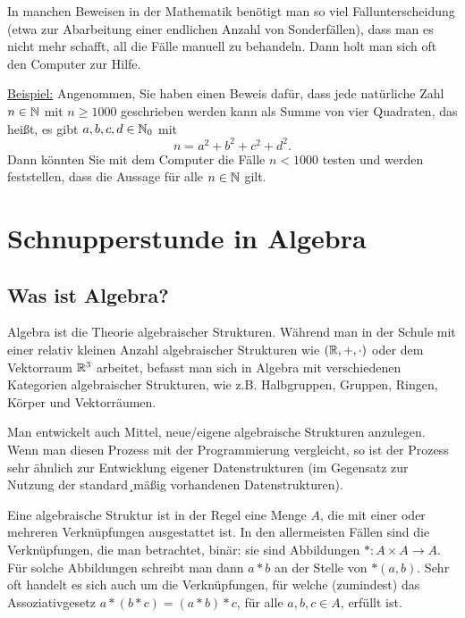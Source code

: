 \begin{bem} 
	In manchen Beweisen in der Mathematik benötigt man so viel Fallunterscheidung (etwa zur Abarbeitung einer endlichen Anzahl von Sonderfällen), dass man es nicht mehr schafft, all die Fälle manuell zu 
behandeln. Dann holt man sich oft den Computer zur Hilfe. 

\underline{Beispiel:} Angenommen, Sie haben einen Beweis dafür, dass jede natürliche Zahl $n \in \mathbb{N}$ mit $n \geq 1000$ geschrieben werden kann als Summe von vier Quadraten, das hei\ss t, es gibt $a,b,c,d \in \mathbb{N}_0$ mit
\[
n = a^2 + b^2 + c^2 + d^2. 
\]
Dann könnten Sie mit dem Computer die Fälle $n < 1000$ testen und werden feststellen, dass die Aussage für alle $n \in \mathbb{N}$ gilt.
\end{bem} 

\section{Schnupperstunde in Algebra} 

\subsection{Was ist Algebra?}

\begin{bem}
	Algebra ist die Theorie algebraischer Strukturen. Während man in der Schule mit einer relativ kleinen Anzahl algebraischer Strukturen wie $(\mathbb{R},+,\cdot)$ oder dem Vektorraum $\mathbb{R}^3$ arbeitet, befasst man sich in Algebra mit verschiedenen Kategorien algebraischer Strukturen, wie z.B. Halbgruppen, Gruppen, Ringen, Körper und Vektorräumen. 

Man entwickelt auch Mittel,  neue/eigene algebraische Strukturen anzulegen. Wenn man diesen Prozess mit der Programmierung vergleicht, so ist der Prozess sehr ähnlich zur Entwicklung eigener Datenstrukturen (im Gegensatz zur Nutzung der standard\-¸mäßig vorhandenen Datenstrukturen). 
\end{bem} 

\begin{bem} 
	Eine algebraische Struktur ist in der Regel eine Menge $A$, die mit einer oder mehreren Verknüpfungen ausgestattet ist. In den allermeisten Fällen sind die Verknüpfungen, die man betrachtet, binär: sie sind Abbildungen $\ast : A \times A \rightarrow A$.  Für solche Abbildungen schreibt man dann $a \ast b$ an der Stelle von $\ast(a,b)$. Sehr oft handelt es sich auch um die Verknüpfungen, für welche (zumindest) das Assoziativgesetz $a \ast (b \ast c) = (a \ast b) \ast c$, für alle $a,b,c \in A$, erfüllt ist. 
\end{bem}	
	
